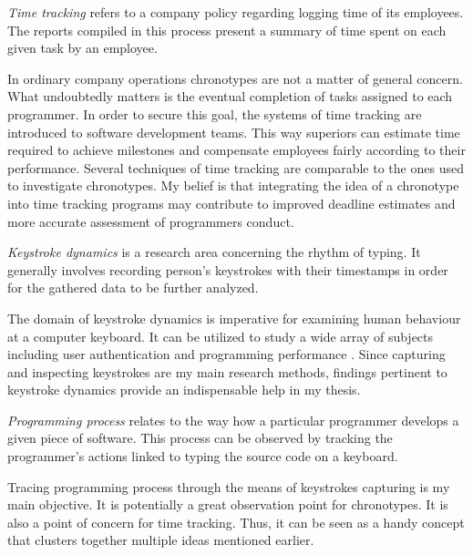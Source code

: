 \begin{definition}
\emph{Time tracking} refers to a company policy regarding logging time of its employees. The reports compiled in this process present a summary of time spent on each given task by an employee. \cite{Fed21TimeTracking}
\end{definition}

In ordinary company operations chronotypes are not a matter of general concern. What undoubtedly matters is the eventual completion of tasks assigned to each programmer. In order to secure this goal, the systems of time tracking are introduced to software development teams. This way superiors can estimate time required to achieve milestones and compensate employees fairly according to their performance. Several techniques of time tracking are comparable to the ones used to investigate chronotypes. My belief is that integrating the idea of a chronotype into time tracking programs may contribute to improved deadline estimates and more accurate assessment of programmers conduct.

\begin{definition}
\emph{Keystroke dynamics} is a research area concerning the rhythm of typing. It generally involves recording person's keystrokes with their timestamps in order for the gathered data to be further analyzed. \cite{Lei19Dissertation}
\end{definition}

The domain of keystroke dynamics is imperative for examining human behaviour at a computer keyboard. It can be utilized to study a wide array of subjects including user authentication \cite{Lei17PreventIdentification} and programming performance \cite{Tho05Performance, Lei16Performance}. Since capturing and inspecting keystrokes are my main research methods, findings pertinent to keystroke dynamics provide an indispensable help in my thesis.

\begin{definition}\label{def:programming_process}
\emph{Programming process} relates to the way how a particular programmer develops a given piece of software. This process can be observed by tracking the programmer's actions linked to typing the source code on a keyboard. \cite{Mat13PPV}
\end{definition}

Tracing programming process through the means of keystrokes capturing is my main objective. It is potentially a great observation point for chronotypes. It is also a point of concern for time tracking. Thus, it can be seen as a handy concept that clusters together multiple ideas mentioned earlier.

